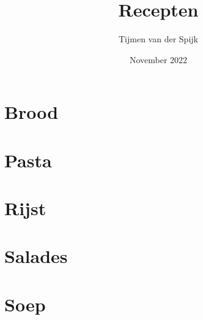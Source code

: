 \documentclass[12pt]{article}
\title{Recepten}
\author{Tijmen van der Spijk}
\date{November 2022}
\begin{document}
\maketitle
\tableofcontents
\pagebreak

\section{Brood}
\pagebreak

\section{Pasta}

\pagebreak

\pagebreak

\pagebreak

\pagebreak

\section{Rijst}

\pagebreak

\pagebreak

\pagebreak

\pagebreak

\section{Salades}

\pagebreak

\pagebreak

\pagebreak

\section{Soep}

\pagebreak
\end{document}
